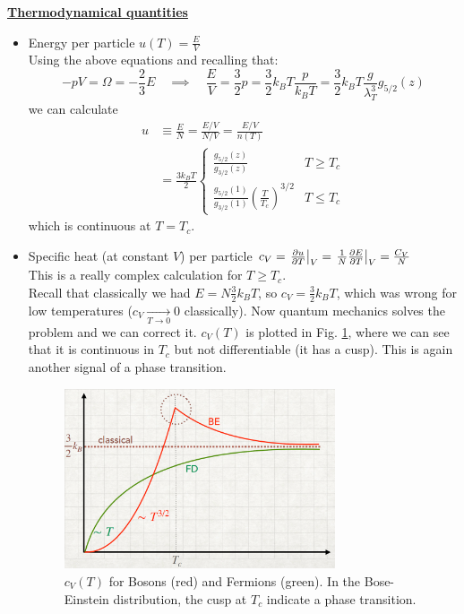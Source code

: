 \underline{\textbf{Thermodynamical quantities}}
\begin{itemize}
    \item Energy per particle $u(T) = \frac EV$\\
    Using the above equations and recalling that:
    $$-pV = \Omega = -\frac23 E \quad \implies \quad \frac EV = \frac32p = \frac32 k_BT \frac p{k_BT} = \frac32 k_BT \frac g{\lambda_T^3} g_{5/2}(z)$$
    we can calculate 
    \begin{align*}
        u &\equiv \frac EN = \frac {E/V}{N/V} = \frac{E/V}{n(T)} \\
        &= \frac{3k_BT}2 \begin{cases} 
            \frac{g_{5/2}(z)}{g_{3/2}(z)} & T \ge T_c \\ 
            \frac{g_{5/2}(1)}{g_{3/2}(1)} \left(\frac T{T_c}\right)^{3/2} & T \le T_c \end{cases}
    \end{align*}
    which is continuous at $T = T_c$.

    \item Specific heat (at constant $V$) per particle $c_V = \left.\frac{\partial u}{\partial T}\right|_V = \left.\frac1N\frac{\partial E}{\partial T}\right|_V = \frac {C_V}N$\\
    This is a really complex calculation for $T\ge T_c$.\\
    Recall that classically we had $E = N \frac32 k_BT$, so $c_V = \frac32 k_BT$, which was wrong for low temperatures ($c_V\xrightarrow[T\to 0]{}0$ classically). Now quantum mechanics solves the problem and we can correct it. $c_V(T)$ is plotted in Fig. \ref{fig:cv}, where we can see that it is continuous in $T_c$ but not differentiable (it has a cusp). This is again another signal of a phase transition.
    \begin{figure}[ht]
        \centering
        \includegraphics[width = 8cm]{images/cv(T).png}
        \caption{$c_V(T)$ for Bosons (red) and Fermions (green). In the Bose-Einstein distribution, the cusp at $T_c$ indicate a phase transition.}
        \label{fig:cv}
    \end{figure}


\end{itemize}
